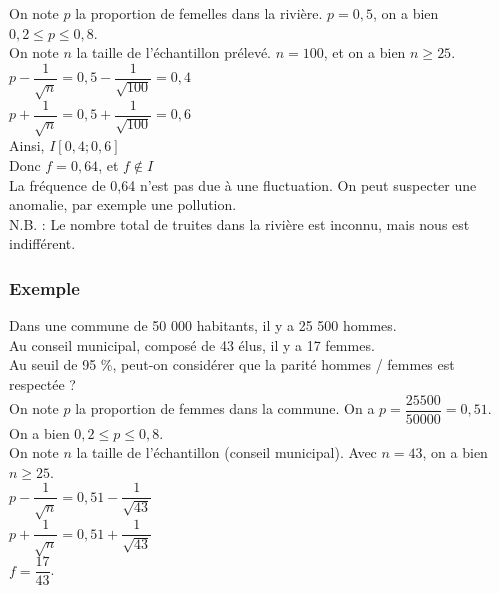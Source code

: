 On note $p$ la proportion de femelles dans la rivière. $p = 0,5$, on a bien $0,2\leq p \leq 0,8$. \\

On note $n$ la taille de l'échantillon prélevé. $n = 100$, et on a bien $n \geq 25$. \\

$ p - \dfrac{1}{\sqrt{n}} = 0, 5- \dfrac{1}{\sqrt{100}} = 0,4 $ \\

$ p + \dfrac{1}{\sqrt{n}} = 0, 5 + \dfrac{1}{\sqrt{100}} = 0,6 $ \\

Ainsi, $ I \left[0,4 ; 0,6 \right]$ \\

Donc $f = 0,64$, et $f \notin I $ \\

La fréquence de 0,64 n'est pas due à une fluctuation. On peut suspecter une anomalie, par exemple une pollution. \\

N.B. : Le nombre total de truites dans la rivière est inconnu, mais nous est indifférent. \\

\newpage

\subsubsection{Exemple }

Dans une commune de 50 000 habitants, il y a 25 500 hommes. \\ Au conseil municipal, composé de 43 élus, il y a 17 femmes. \\ Au seuil de 95  \%, peut-on considérer que la parité hommes / femmes est respectée ? \\

On note $p$ la proportion de femmes dans la commune. On a $p = \dfrac{25500}{50 000} = 0,51$. On a bien $0,2\leq p \leq 0,8$. \\

On note $n$ la taille de l'échantillon (conseil municipal). Avec $n = 43$, on a bien $n \geq 25$. \\

$ p - \dfrac{1}{\sqrt{n}} = 0, 51- \dfrac{1}{\sqrt{43}} $ \\

$ p + \dfrac{1}{\sqrt{n}} = 0, 51 + \dfrac{1}{\sqrt{43}}  $ \\

$ f = \dfrac{17}{43} $. \\

